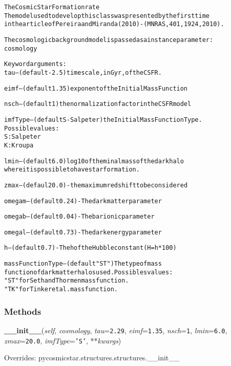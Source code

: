 \begin{alltt}
The Cosmic Star Formation rate
The model used to develop this class was presented by the first time
in the article of Pereira and Miranda (2010) - (MNRAS, 401, 1924, 2010).

The cosmologic background model is passed as a instance parameter:
    cosmology

Keyword arguments:
    tau -- (default - 2.5) time scale, in Gyr, of the CSFR.

    eimf -- (default 1.35) exponent of the Initial Mass Function

    nsch -- (default 1) the normalization factor in the CSFR model

    imfType -- (default S - Salpeter) the Initial Mass Function Type.
               Possible values:
                   S: Salpeter
                   K: Kroupa

    lmin -- (default 6.0) log10 of the minal mass of the dark halo
                        where it is possible to have star formation.

    zmax -- (defaul 20.0) - the maximum redshift to be considered

    omegam -- (default 0.24) - The dark matter parameter

    omegab -- (default 0.04) - The barionic parameter

    omegal -- (default 0.73) - The dark energy parameter

    h -- (default 0.7) - The h of the Hubble constant (H = h * 100)

    massFunctionType -- (default "ST") The type of mass
    function of dark matter halos used. Possibles values:
         "ST" for Seth and Thormen mass function.
         "TK" for Tinker et al. mass function.
\end{alltt}



  \subsubsection{Methods}

    \vspace{0.5ex}

\hspace{.8\funcindent}\begin{boxedminipage}{\funcwidth}

    \raggedright \textbf{\_\_init\_\_}(\textit{self}, \textit{cosmology}, \textit{tau}={\tt 2.29}, \textit{eimf}={\tt 1.35}, \textit{nsch}={\tt 1}, \textit{lmin}={\tt 6.0}, \textit{zmax}={\tt 20.0}, \textit{imfType}={\tt \texttt{'}\texttt{S}\texttt{'}}, **\textit{kwargs})

\setlength{\parskip}{2ex}
\setlength{\parskip}{1ex}
      Overrides: pycosmicstar.structures.structures.\_\_init\_\_

    \end{boxedminipage}

